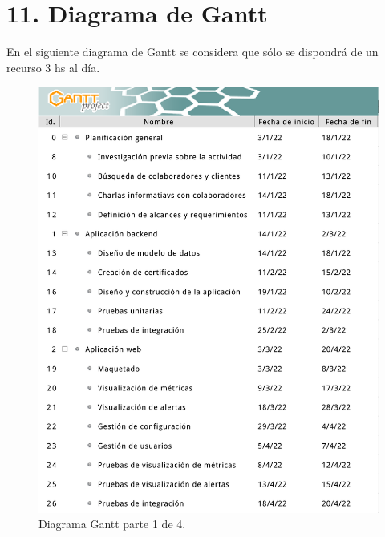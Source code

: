 \documentclass[
11pt, %
codirector, %
]{charter}
\begin{document}
\section{11. Diagrama de Gantt}
\label{sec:gantt}

En el siguiente diagrama de Gantt se considera que sólo se dispondrá de un recurso 3 hs al día.

\begin{figure}[htpb]
\centering 
\includegraphics[width=.8\textwidth]{./Figuras/gantt-1.png}
\caption{Diagrama Gantt parte 1 de 4.}
\label{fig:gantt1}
\end{figure}
\end{document}
